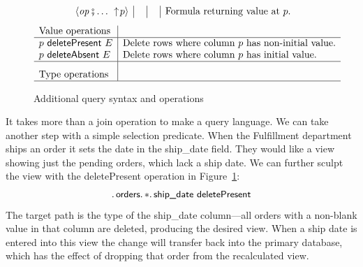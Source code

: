 \documentclass[english,submission]{programming}
\theoremstyle{definition}
\providecommand{\DIFaddendFL}{} %
\begin{document}
\begin{figure}
{\[\begin{array}{r@{\ }l|r@{\ }l|r@{\ }l|l}
  & \langle \mathit{op}\fatsemi \ldots \ \uparrow\! p \rangle &&
  && &
  \textrm{Formula returning value at $p$.} \\

\end{array}\]
\vspace{-4pt}
\[
\begin{array}{l|l}
  \textrm{Value operations} & \\
  \hline

  p \textsf{ deletePresent } E & \textrm{Delete rows where column $p$ has non-initial value.} \\
  p \textsf{ deleteAbsent } E & \textrm{Delete rows where column $p$ has initial value.} \\


  \hline

  \textrm{Type operations} & \rule[0pt]{0pt}{16pt}\\
  \hline

\end{array}\]
}
\vspace{-4pt}
  \DIFaddendFL \caption{Additional query syntax and operations}
  \label{fig:query-addons}
\end{figure}

It takes more than a join operation to make a query language. We can take another step with a simple selection predicate. When the Fulfillment department ships an order it sets the date in the \textsf{ship\_date} field. They would like a view showing just the pending orders, which lack a ship date. We can further sculpt the view with the \textsf{deletePresent} operation in Figure~\ref{fig:query-addons}:
\[
\ldotp \textsf{orders}\ldotp * \ldotp \textsf{ship\_date deletePresent} \\
\]
The target path is the type of the \textsf{ship\_date} column---all orders with a non-blank value in that column are deleted, producing the desired view. When a ship date is entered into this view the change will transfer back into the primary database, which has the effect of dropping that order from the recalculated view.
\end{document}
